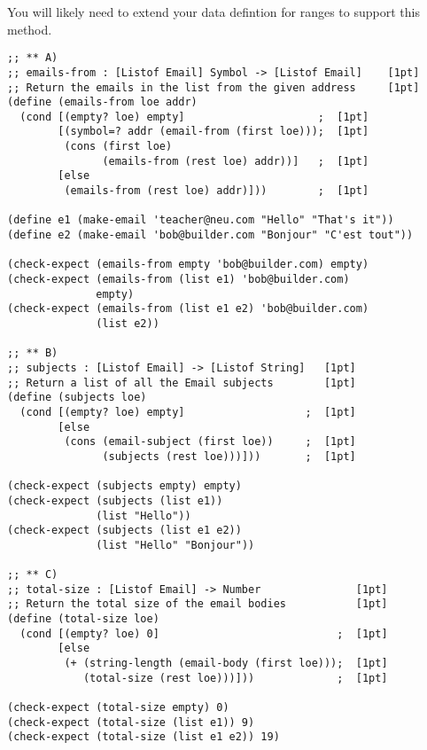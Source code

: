 \documentclass[12pt]{article}                   %
\newenvironment{solution}{}{}
\begin{document}
\begin{problem}
\begin{itemize}
  You will likely need to extend your data defintion for ranges to
  support this method.  

\end{itemize}

\newpage
\ifrubric{}
\newpage
\fi

\begin{solution}
\begin{verbatim}
;; ** A)
;; emails-from : [Listof Email] Symbol -> [Listof Email]    [1pt]
;; Return the emails in the list from the given address     [1pt]
(define (emails-from loe addr)
  (cond [(empty? loe) empty]                     ;  [1pt]
        [(symbol=? addr (email-from (first loe)));  [1pt]
         (cons (first loe)
               (emails-from (rest loe) addr))]   ;  [1pt]
        [else
         (emails-from (rest loe) addr)]))        ;  [1pt]

(define e1 (make-email 'teacher@neu.com "Hello" "That's it"))
(define e2 (make-email 'bob@builder.com "Bonjour" "C'est tout"))

(check-expect (emails-from empty 'bob@builder.com) empty)
(check-expect (emails-from (list e1) 'bob@builder.com)
              empty)
(check-expect (emails-from (list e1 e2) 'bob@builder.com)
              (list e2))

;; ** B)
;; subjects : [Listof Email] -> [Listof String]   [1pt]
;; Return a list of all the Email subjects        [1pt]
(define (subjects loe)
  (cond [(empty? loe) empty]                   ;  [1pt]
        [else
         (cons (email-subject (first loe))     ;  [1pt]
               (subjects (rest loe)))]))       ;  [1pt]

(check-expect (subjects empty) empty)
(check-expect (subjects (list e1))
              (list "Hello"))
(check-expect (subjects (list e1 e2))
              (list "Hello" "Bonjour"))

;; ** C)
;; total-size : [Listof Email] -> Number               [1pt]
;; Return the total size of the email bodies           [1pt]
(define (total-size loe)
  (cond [(empty? loe) 0]                            ;  [1pt]
        [else
         (+ (string-length (email-body (first loe)));  [1pt]
            (total-size (rest loe)))]))             ;  [1pt]

(check-expect (total-size empty) 0)
(check-expect (total-size (list e1)) 9)
(check-expect (total-size (list e1 e2)) 19)
\end{verbatim}
\end{solution}
\end{problem}
\ifrubric\bigskip\else
\newpage
\fi
\end{document}
